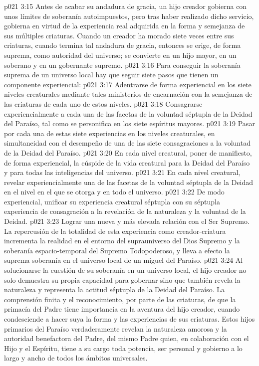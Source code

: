 \vs p021 3:15 Antes de acabar su andadura de gracia, un hijo creador gobierna con unos límites de soberanía autoimpuestos, pero tras haber realizado dicho servicio, gobierna en virtud de la experiencia real adquirida en la forma y semejanza de sus múltiples criaturas. Cuando un creador ha morado siete veces entre sus criaturas, cuando termina tal andadura de gracia, entonces se erige, de forma suprema, como autoridad del universo; se convierte en un hijo mayor, en un soberano y en un gobernante supremo.
\vs p021 3:16 \pc Para conseguir la soberanía suprema de un universo local hay que seguir siete pasos que tienen un componente experiencial:
\vs p021 3:17 Adentrarse de forma experiencial en los siete niveles creaturales mediante tales ministerios de encarnación con la semejanza de las criaturas de cada uno de estos niveles.
\vs p021 3:18 Consagrarse experiencialmente a cada una de las facetas de la voluntad séptupla de la Deidad del Paraíso, tal como se personifica en los siete espíritus mayores.
\vs p021 3:19 Pasar por cada una de estas siete experiencias en los niveles creaturales, en simultaneidad con el desempeño de una de las siete consagraciones a la voluntad de la Deidad del Paraíso.
\vs p021 3:20 En cada nivel creatural, poner de manifiesto, de forma experiencial, la cúspide de la vida creatural para la Deidad del Paraíso y para todas las inteligencias del universo.
\vs p021 3:21 En cada nivel creatural, revelar experiencialmente una de las facetas de la voluntad séptupla de la Deidad en el nivel en el que se otorga y en todo el universo.
\vs p021 3:22 De modo experiencial, unificar su experiencia creatural séptupla con su séptupla experiencia de consagración a la revelación de la naturaleza y la voluntad de la Deidad.
\vs p021 3:23 Lograr una nueva y más elevada relación con el Ser Supremo. La repercusión de la totalidad de esta experiencia como creador\hyp{}criatura incrementa la realidad en el entorno del suprauniverso del Dios Supremo y la soberanía espacio\hyp{}temporal del Supremo Todopoderoso, y lleva a efecto la suprema soberanía en el universo local de un miguel del Paraíso.
\vs p021 3:24 \pc Al solucionarse la cuestión de su soberanía en un universo local, el hijo creador no solo demuestra su propia capacidad para gobernar sino que también revela la naturaleza y representa la actitud séptupla de la Deidad del Paraíso. La comprensión finita y el reconocimiento, por parte de las criaturas, de que la primacía del Padre tiene importancia en la aventura del hijo creador, cuando condesciende a hacer suya la forma y las experiencias de sus criaturas. Estos hijos primarios del Paraíso verdaderamente revelan la naturaleza amorosa y la autoridad benefactora del Padre, del mismo Padre quien, en colaboración con el Hijo y el Espíritu, tiene a su cargo toda potencia, ser personal y gobierno a lo largo y ancho de todos los ámbitos universales.
